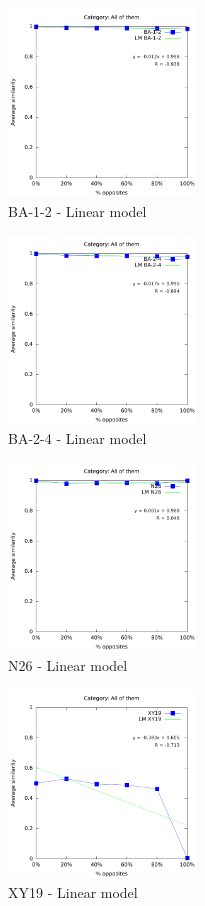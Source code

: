 \documentclass[a4paper,10pt]{article}
\begin{document}
\begin{figure}[ht]{\centering
\includegraphics[height=5cm]{allcat_BA-1-2_LM.pdf}
\caption{BA-1-2 - Linear model}
}\end{figure}
\begin{figure}[ht]{\centering
\includegraphics[height=5cm]{allcat_BA-2-4_LM.pdf}
\caption{BA-2-4 - Linear model}
}\end{figure}
\begin{figure}[ht]{\centering
\includegraphics[height=5cm]{allcat_N26_LM.pdf}
\caption{N26 - Linear model}
}\end{figure}
\begin{figure}[ht]{\centering
\includegraphics[height=5cm]{allcat_XY19_LM.pdf}
\caption{XY19 - Linear model}
}\end{figure}
\end{document}
